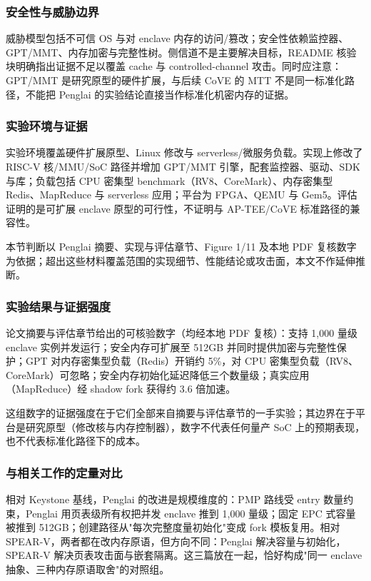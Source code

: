 \documentclass[11pt]{ctexart}
\begin{document}
\subsubsection{安全性与威胁边界}
威胁模型包括不可信 OS 与对 enclave 内存的访问/篡改；安全性依赖监控器、GPT/MMT、内存加密与完整性树。侧信道不是主要解决目标，README 核验块明确指出证据不足以覆盖 cache 与 controlled-channel 攻击。同时应注意：GPT/MMT 是研究原型的硬件扩展，与后续 CoVE 的 MTT 不是同一标准化路径，不能把 Penglai 的实验结论直接当作标准化机密内存的证据。\par
\subsubsection{实验环境与证据}
实验环境覆盖硬件扩展原型、Linux 修改与 serverless/微服务负载。实现上修改了 RISC-V 核/MMU/SoC 路径并增加 GPT/MMT 引擎，配套监控器、驱动、SDK 与库；负载包括 CPU 密集型 benchmark（RV8、CoreMark）、内存密集型 Redis、MapReduce 与 serverless 应用；平台为 FPGA、QEMU 与 Gem5。评估证明的是可扩展 enclave 原型的可行性，不证明与 AP-TEE/CoVE 标准路径的兼容性。\par
本节判断以 Penglai 摘要、实现与评估章节、Figure 1/11 及本地 PDF 复核数字为依据；超出这些材料覆盖范围的实现细节、性能结论或攻击面，本文不作延伸推断。\par
\subsubsection{实验结果与证据强度}
论文摘要与评估章节给出的可核验数字（均经本地 PDF 复核）：支持 1,000 量级 enclave 实例并发运行；安全内存可扩展至 512GB 并同时提供加密与完整性保护；GPT 对内存密集型负载（Redis）开销约 5\%，对 CPU 密集型负载（RV8、CoreMark）可忽略；安全内存初始化延迟降低三个数量级；真实应用（MapReduce）经 shadow fork 获得约 3.6 倍加速。\par
这组数字的证据强度在于它们全部来自摘要与评估章节的一手实验；其边界在于平台是研究原型（修改核与内存控制器），数字不代表任何量产 SoC 上的预期表现，也不代表标准化路径下的成本。\par
\subsubsection{与相关工作的定量对比}
相对 Keystone 基线，Penglai 的改进是规模维度的：PMP 路线受 entry 数量约束，Penglai 用页表级所有权把并发 enclave 推到 1,000 量级；固定 EPC 式容量被推到 512GB；创建路径从"每次完整度量初始化"变成 fork 模板复用。相对 SPEAR-V，两者都在改内存原语，但方向不同：Penglai 解决容量与初始化，SPEAR-V 解决页表攻击面与嵌套隔离。这三篇放在一起，恰好构成"同一 enclave 抽象、三种内存原语取舍"的对照组。\par
\end{document}

